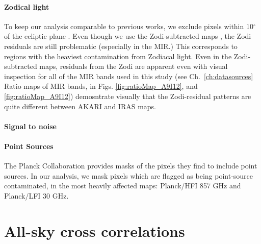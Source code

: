      \paragraph{Zodical light}
        To keep our analysis comparable to previous works, we exclude pixels within 10$^{\circ}$ of the ecliptic plane \citep{hensley16}.  Even though we use the Zodi-subtracted maps \citep{kelsall98, kondo16, ootsubo16}, the Zodi residuals are still problematic (especially in the MIR.) This corresponds to regions with the heaviest contamination from Zodiacal light. Even in the Zodi-subtracted maps, residuals from the Zodi are apparent even with visual inspection for all of the MIR bands used in this study (see Ch.~\ref{ch:datasources} Ratio maps of MIR bands, in Figs. \ref{fig:ratioMap_A9I12}, and \ref{fig:ratioMap_A9I12}) demosntrate visually that the Zodi-residual patterns are quite different between AKARI and IRAS maps.

      \paragraph{Signal to noise}

     \paragraph{Point Sources}
       The Planck Collaboration provides masks of the pixels they find to include point sources. In our analysis, we mask pixels which are flagged as being point-source contaminated, in the most heavily affected maps: Planck/HFI 857 GHz and Planck/LFI 30 GHz.

  \section{All-sky cross correlations}


